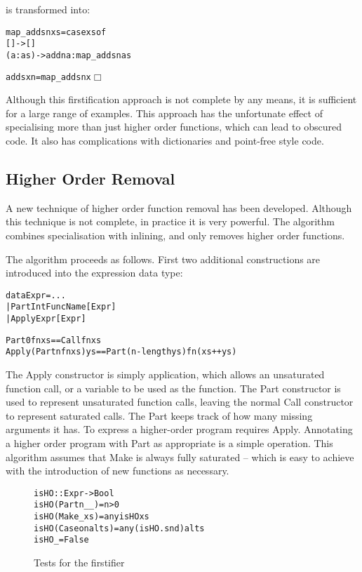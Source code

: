 \documentclass[preprint]{sigplanconf}
\newcommand{\C}[1]{\textsf{#1}}
\newcommand{\noexample}{\hfill$\Box$}
\newenvironment{code}{\begin{alltt}\small}{\end{alltt}}
\begin{document}
\noindent is transformed into:

\begin{code}
map_adds n xs = case xs of
                     []     -> []
                     (a:as) -> add n a : map_adds n as

adds x n = map_adds n x\noexample
\end{code}

Although this firstification approach is not complete by any means, it is sufficient for a large range of examples. This approach has the unfortunate effect of specialising more than just higher order functions, which can lead to obscured code. It also has complications with dictionaries and point-free style code.

\subsection{Higher Order Removal}

A new technique of higher order function removal has been developed. Although this technique is not complete, in practice it is very powerful. The algorithm combines specialisation with inlining, and only removes higher order functions.

The algorithm proceeds as follows. First two additional constructions are introduced into the expression data type:

\begin{code}
data Expr  =  ...
           |  Part Int FuncName [Expr]
           |  Apply Expr [Expr]

Part 0 fn xs == Call fn xs
Apply (Part n fn xs) ys == Part (n - length ys) fn (xs ++ ys)
\end{code}

The \C{Apply} constructor is simply application, which allows an unsaturated function call, or a variable to be used as the function. The \C{Part} constructor is used to represent unsaturated function calls, leaving the normal \C{Call} constructor to represent saturated calls. The \C{Part} keeps track of how many missing arguments it has. To express a higher-order program requires \C{Apply}. Annotating a higher order program with \C{Part} as appropriate is a simple operation. This algorithm assumes that \C{Make} is always fully saturated -- which is easy to achieve with the introduction of new functions as necessary.

\begin{figure}
\begin{code}
isHO :: Expr -> Bool
isHO (Part n _ _)    = n > 0
isHO (Make _ xs)     = any isHO xs
isHO (Case on alts)  = any (isHO . snd) alts
isHO _               = False
\end{code}
\caption{Tests for the firstifier}
\label{fig:firstify}
\end{figure}
\end{document}
